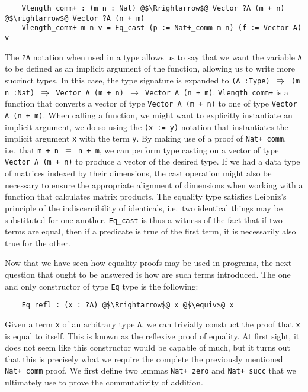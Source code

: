 \documentclass[12pt,twoside,maitrise]{dms}
\theoremstyle{definition}
\numberwithin{equation}{section}
\numberwithin{table}{chapter}
\numberwithin{figure}{chapter}
\newcommand\id[1] {\texttt{#1}}
\newcommand\fn[1] {\texttt{#1}}
\begin{document}
\begin{verbatim}
    Vlength_comm+ : (m n : Nat) @$\Rrightarrow$@ Vector ?A (m + n) @$\rightarrow$@ Vector ?A (n + m)
    Vlength_comm+ m n v = Eq_cast (p := Nat+_comm m n) (f := Vector A) v
\end{verbatim}

The \id{?A} notation when used in a type allows us to say that we want the
variable \id{A} to be defined as an implicit argument of the function, allowing
us to write more succinct types. In this case, the type signature is expanded to
\fn{(A :\@ Type) $\Rrightarrow$ (m n :\@ Nat) $\Rrightarrow$ Vector A
  (m + n) $\rightarrow$ Vector A (n + m)}. \fn{Vlength\_comm+} is a function
that converts a vector of type \fn{Vector A (m + n)} to one of type \fn{Vector A
  (n + m)}. When calling a function, we might want to explicitly instantiate an
implicit argument, we do so using the \fn{(x := y)} notation that instantiates
the implicit argument \id{x} with the term \id{y}. By making use of a proof of
\id{Nat+\_comm}, i.e.\ that \fn{m + n $\equiv$ n + m}, we can perform type
casting on a vector of type \fn{Vector A (m + n)} to produce a vector of the
desired type. If we had a data type of matrices indexed by their dimensions, the
cast operation might also be necessary to ensure the appropriate alignment of
dimensions when working with a function that calculates matrix products. The
equality type satisfies Leibniz's principle of the indiscernibility of
identicals, i.e.\ two identical things may be substituted for one another.
\fn{Eq\_cast} is thus a witness of the fact that if two terms are equal, then if
a predicate is true of the first term, it is necessarily also true for the
other.

Now that we have seen how equality proofs may be used in programs, the next
question that ought to be answered is how are such terms introduced. The one and
only constructor of type \id{Eq} type is the following:

\begin{verbatim}
    Eq_refl : (x : ?A) @$\Rrightarrow$@ x @$\equiv$@ x
\end{verbatim}

Given a term \id{x} of an arbitrary type \id{A}, we can trivially construct the
proof that \id{x} is equal to itself. This is known as the reflexive proof of
equality. At first sight, it does not seem like this constructor would be
capable of much, but it turns out that this is precisely what we require the
complete the previously mentioned \id{Nat+\_comm} proof. We first define two
lemmas \id{Nat+\_zero} and \id{Nat+\_succ} that we ultimately use to prove the
commutativity of addition.
\end{document}
